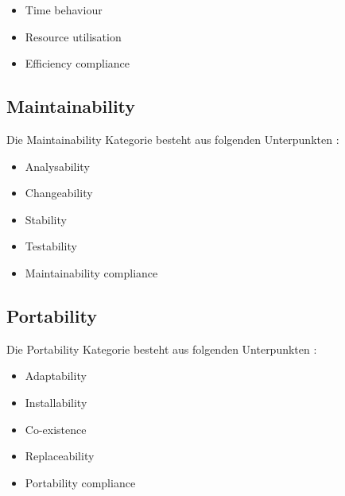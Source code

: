 \begin{itemize}
  \item \glqq Time behaviour\grqq
  \item \glqq Resource utilisation\grqq
  \item \glqq Efficiency compliance\grqq
\end{itemize}

\cite[S. 10]{ISO_SQ}

\subsection{Maintainability}
Die Maintainability Kategorie besteht aus folgenden Unterpunkten \cite[S. 7]{ISO_SQ}:

\begin{itemize}
  \item \glqq Analysability\grqq
  \item \glqq Changeability\grqq
  \item \glqq Stability\grqq
  \item \glqq Testability\grqq
  \item \glqq Maintainability compliance\grqq
\end{itemize}

\cite[S. 10-11]{ISO_SQ}


\subsection{Portability}
Die Portability Kategorie besteht aus folgenden Unterpunkten \cite[S. 7]{ISO_SQ}:

\begin{itemize}
  \item \glqq Adaptability\grqq
  \item \glqq Installability\grqq
  \item \glqq Co-existence\grqq
  \item \glqq Replaceability\grqq
  \item \glqq Portability compliance\grqq
\end{itemize}

\cite[S. 11]{ISO_SQ}